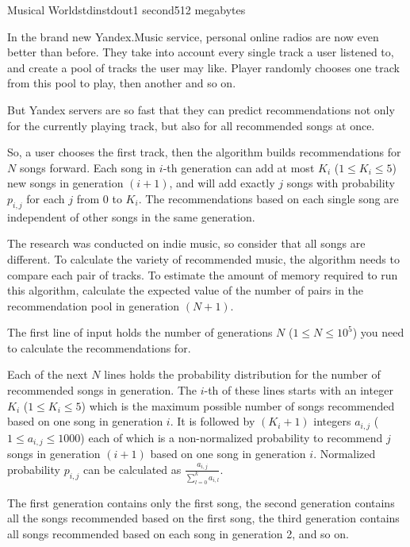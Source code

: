 \begin{problem}{Musical World}{stdin}{stdout}{1 second}{512 megabytes}

In the brand new Yandex.Music service, personal online radios are now even better than before. They take into account every single track a user listened to, and create a pool of tracks the user may like. Player randomly chooses one track from this pool to play, then another and so on.

But Yandex servers are so fast that they can predict recommendations not only for the currently playing track, but also for all recommended songs at once.

So, a user chooses the first track, then the algorithm builds recommendations for $N$ songs forward. Each song in $i$-th generation can add at most $K_i$ ($1 \le K_i \le 5$) new songs in generation $(i + 1)$, and will add exactly $j$ songs with probability $p_{i, j}$ for each $j$ from $0$ to $K_i$. The recommendations based on each single song are independent of other songs in the same generation.

The research was conducted on indie music, so consider that all songs are different. To calculate the variety of recommended music, the algorithm needs to compare each pair of tracks. To estimate the amount of memory required to run this algorithm, calculate the expected value of the number of pairs in the recommendation pool in generation $(N + 1)$.

\InputFile
The first line of input holds the number of generations $N$ ($1 \le N \le 10^5$) you need to calculate the recommendations for.

Each of the next $N$ lines holds the probability distribution for the number of recommended songs in generation.
The $i$-th of these lines starts with an integer $K_i$ ($1 \le K_i \le 5$) which is the maximum possible number of songs recommended based on one song in generation $i$.
It is followed by $(K_i + 1)$ integers $a_{i, j}$ ($1 \le a_{i, j} \le 1000$) each of which is a non-normalized probability to recommend $j$ songs in generation $(i + 1)$ based on one song in generation $i$.
Normalized probability $p_{i,j}$ can be calculated as $\frac{a_{i,j}}{\sum\limits_{l=0}^{k}{a_{i,l}}}$.

The first generation contains only the first song, the second generation contains all the songs recommended based on the first song, the third generation contains all songs recommended based on each song in generation 2, and so on.


\end{problem}
